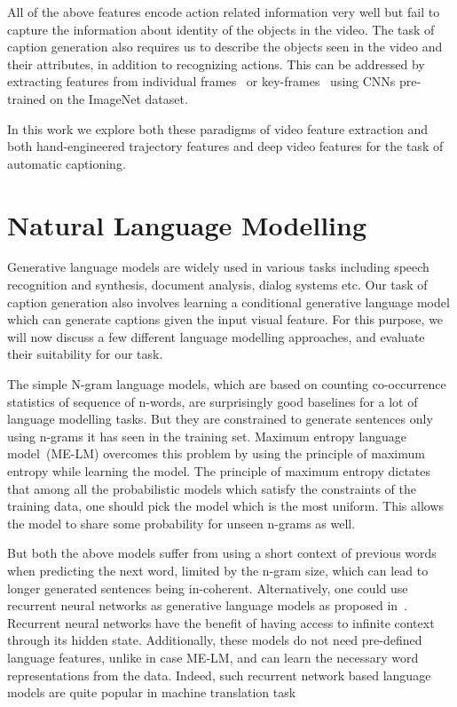 All of the above features encode action related information very well but fail to
capture the information about identity of the objects in the video.
The task of caption generation also requires us to describe the objects seen in
the video and their attributes, in addition to recognizing actions.
This can be addressed by extracting features from individual
frames~\cite{venugopalan2015sequence} or key-frames~\cite{shetty2015video} using
CNNs pre-trained on the ImageNet dataset.

In this work we explore both these paradigms of video feature extraction and
both hand-engineered trajectory features and deep video features for the task of
automatic captioning.

\section{Natural Language Modelling}
Generative language models are widely used in various tasks including speech
recognition and synthesis, document analysis, dialog systems etc.
Our task of caption generation also involves learning a conditional generative
language model which can generate captions given the input visual feature.
For this purpose, we will now discuss a few different language modelling
approaches, and evaluate their suitability for our task.

The simple N-gram language models, which are based on counting co-occurrence
statistics of sequence of n-words, are surprisingly good baselines for a lot of
language modelling tasks.
But they are constrained to generate sentences only using n-grams it has seen in
the training set.
Maximum entropy language model~\cite{berger1996maximum}(ME-LM) overcomes this
problem by using the principle of maximum entropy while learning the model.
The principle of maximum entropy dictates that among all the probabilistic
models which satisfy the constraints of the training data, one should pick the
model which is the most uniform.
This allows the model to share some probability for unseen n-grams as well.

But both the above models suffer from using a short context of previous
words when predicting the next word, limited by the n-gram size, which can lead
to longer generated sentences being in-coherent.
Alternatively, one could use recurrent neural networks as generative language
models as proposed in~\cite{mikolov2010recurrent}.
Recurrent neural networks have the benefit of having access to infinite context
through its hidden state.
Additionally, these models do not need pre-defined language features, unlike in case
ME-LM, and can learn the necessary word representations from the data. 
Indeed, such recurrent network based language models are quite popular in
machine translation task~\cite{bahdanau2014neural}

